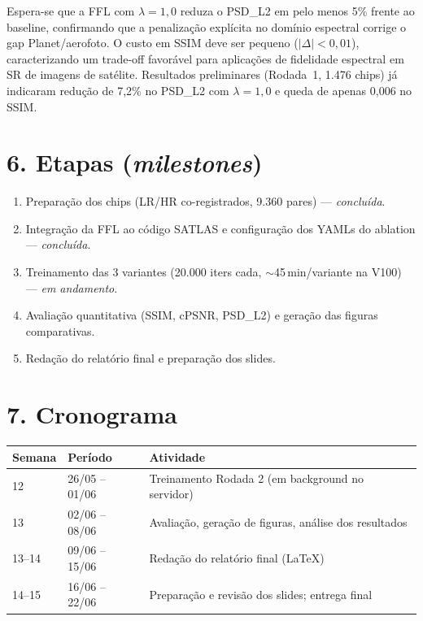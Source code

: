 \documentclass[12pt, a4paper]{article}
\begin{document}
Espera-se que a FFL com $\lambda=1{,}0$ reduza o PSD\_L2 em pelo menos 5\% frente ao
baseline, confirmando que a penalização explícita no domínio espectral corrige o gap
Planet/aerofoto. O custo em SSIM deve ser pequeno ($|\Delta|<0{,}01$), caracterizando
um trade-off favorável para aplicações de fidelidade espectral em SR de imagens de satélite.
Resultados preliminares (Rodada~1, 1.476 chips) já indicaram redução de 7,2\% no PSD\_L2
com $\lambda=1{,}0$ e queda de apenas 0,006 no SSIM.

\section*{6. Etapas (\textit{milestones})}

\begin{enumerate}[leftmargin=*, topsep=2pt, itemsep=1pt]
    \item Preparação dos chips (LR/HR co-registrados, 9.360 pares) --- \textit{concluída}.
    \item Integração da FFL ao código SATLAS e configuração dos YAMLs do ablation --- \textit{concluída}.
    \item Treinamento das 3 variantes (20.000 iters cada, $\sim$45\,min/variante na V100) --- \textit{em andamento}.
    \item Avaliação quantitativa (SSIM, cPSNR, PSD\_L2) e geração das figuras comparativas.
    \item Redação do relatório final e preparação dos slides.
\end{enumerate}

\section*{7. Cronograma}

\begin{center}
\begin{tabular}{lll}
    \toprule
    Semana & Período & Atividade \\
    \midrule
    12 & 26/05 -- 01/06 & Treinamento Rodada 2 (em background no servidor) \\
    13 & 02/06 -- 08/06 & Avaliação, geração de figuras, análise dos resultados \\
    13--14 & 09/06 -- 15/06 & Redação do relatório final (LaTeX) \\
    14--15 & 16/06 -- 22/06 & Preparação e revisão dos slides; entrega final \\
    \bottomrule
\end{tabular}
\end{center}
\end{document}
